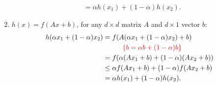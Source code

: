 \documentclass{article}
\begin{document}
\begin{enumerate}
\begin{align*}
	 &= \alpha h(x_1) + (1-\alpha) h(x_2).
	\end{align*}
	\item $h(x) = f(Ax + b)$, for any $d\times d$ matrix $A$ and $d\times 1$ vector $b$:
	\begin{align*}
	h(\alpha x_1 + (1-\alpha)x_2) &= f(A(\alpha x_1 + (1-\alpha)x_2) + b)\\
	 & \hspace*{1cm} {\color{red} \{ b = \alpha b + (1 - \alpha) b\}}\\
	 &= f( \alpha ( Ax_1 + b ) + (1-\alpha) ( Ax_2 + b ) )\\
	 &\leq \alpha f(Ax_1 + b) + (1-\alpha) f(Ax_2 + b)\\
	 &= \alpha h(x_1) + (1-\alpha) h(x_2).
	\end{align*}
  \end{enumerate}
\end{document}
